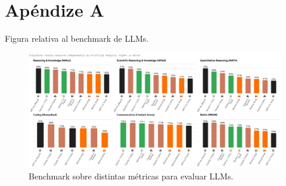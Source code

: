 

\chapter{Apéndize A}
\label{apendize-a}

Figura relativa al benchmark de LLMs.

\begin{figure}[!h]
\centering
\includegraphics[width=1.1\textwidth,angle=90]{figuras/capitulo6/benchmark.png}
\caption{Benchmark sobre distintas métricas para evaluar LLMs. \citep{artificialanalysis}}
\label{fig:benchmark}
\end{figure}
